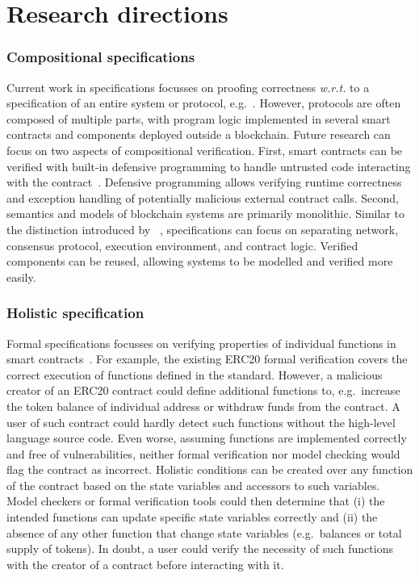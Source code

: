 \section{Research directions}
\label{discuss}

\subsubsection{Compositional specifications}
Current work in specifications focusses on proofing correctness \emph{w.r.t.} to a specification of an entire system or protocol, e.g.~\cite{Pirlea2018}.
However, protocols are often composed of multiple parts, with program logic implemented in several smart contracts and components deployed outside a blockchain.
Future research can focus on two aspects of compositional verification.
First, smart contracts can be verified with built-in defensive programming to handle untrusted code interacting with the contract~\cite{Miller2018smart}.
Defensive programming allows verifying runtime correctness and exception handling of potentially malicious external contract calls.
Second, semantics and models of blockchain systems are primarily monolithic.
Similar to the distinction introduced by \citeauthor{Bonneau2015}~\cite{Bonneau2015}, specifications can focus on separating network, consensus protocol, execution environment, and contract logic.
Verified components can be reused, allowing systems to be modelled and verified more easily.

\subsubsection{Holistic specification}
Formal specifications focusses on verifying properties of individual functions in smart contracts~\cite{Hildenbrandt2017}.
For example, the existing ERC20 formal verification covers the correct execution of functions defined in the standard.
However, a malicious creator of an ERC20 contract could define additional functions to, e.g.\ increase the token balance of individual address or withdraw funds from the contract.
A user of such contract could hardly detect such functions without the high-level language source code.
Even worse, assuming functions are implemented correctly and free of vulnerabilities, neither formal verification nor model checking would flag the contract as incorrect.
Holistic conditions can be created over any function of the contract based on the state variables and accessors to such variables.
Model checkers or formal verification tools could then determine that (i) the intended functions can update specific state variables correctly and (ii) the absence of any other function that change state variables (e.g.\ balances or total supply of tokens).
In doubt, a user could verify the necessity of such functions with the creator of a contract before interacting with it.


